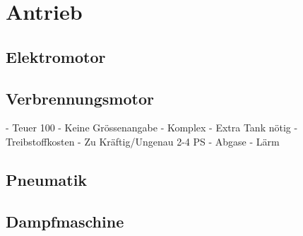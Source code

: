 \section{Antrieb}

\subsection{Elektromotor}

\subsection{Verbrennungsmotor}
- Teuer 100
- Keine Grössenangabe
- Komplex
- Extra Tank nötig
- Treibstoffkosten
- Zu Kräftig/Ungenau 2-4 PS
- Abgase
- Lärm




\subsection{Pneumatik}

\subsection{Dampfmaschine}
